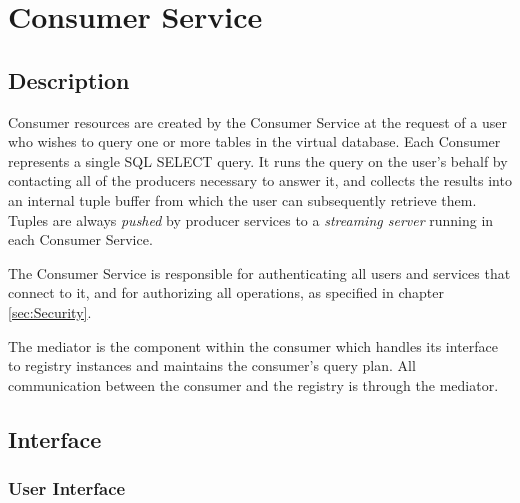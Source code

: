 \section{Consumer Service}\label{sec:Consumer}
\subsection{Description}

Consumer resources are created by the Consumer Service at the request
of a user who wishes to query one or more tables in the virtual
database. Each Consumer represents a single SQL SELECT query. It runs
the query on the user's behalf by contacting all of the producers
necessary to answer it, and collects the results into an internal
tuple buffer from which the user can
subsequently retrieve them. Tuples are always \textit{pushed} by
producer services to a \textit{streaming server} running in each
Consumer Service.

The Consumer Service is responsible for authenticating all users and services
that connect to it, and for authorizing all operations, as specified in
chapter \ref{sec:Security}.

The mediator is the component within the consumer which handles its interface
to registry instances and maintains the consumer's query plan. All communication 
between the consumer and the registry is through the mediator. 

\subsection{Interface}

\subsubsection{User Interface}

